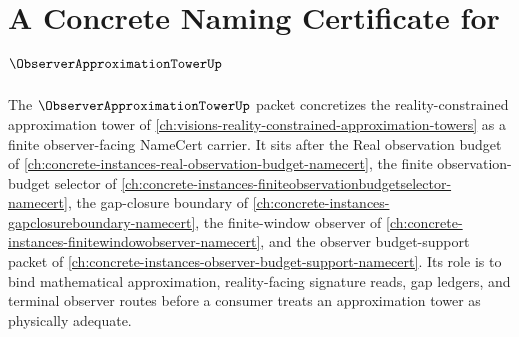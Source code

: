 \chapter{A Concrete Naming Certificate for $\ObserverApproximationTowerUp$}
\label{ch:concrete-instances-observer-approximation-tower-namecert}

The $\ObserverApproximationTowerUp$ packet concretizes the reality-constrained approximation tower of \autoref{ch:visions-reality-constrained-approximation-towers} as a finite observer-facing NameCert carrier. It sits after the Real observation budget of \autoref{ch:concrete-instances-real-observation-budget-namecert}, the finite observation-budget selector of \autoref{ch:concrete-instances-finiteobservationbudgetselector-namecert}, the gap-closure boundary of \autoref{ch:concrete-instances-gapclosureboundary-namecert}, the finite-window observer of \autoref{ch:concrete-instances-finitewindowobserver-namecert}, and the observer budget-support packet of \autoref{ch:concrete-instances-observer-budget-support-namecert}. Its role is to bind mathematical approximation, reality-facing signature reads, gap ledgers, and terminal observer routes before a consumer treats an approximation tower as physically adequate.



